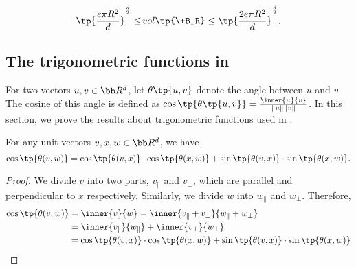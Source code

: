 \begin{corollary}\label{cor:dballvolbound}
    \[
        \tp{\frac{e\pi R^2}{d}}^{\frac{d}{2}}\le\!{vol}\tp{\+B_R} \le \tp{\frac{2e\pi R^2}{d}}^{\frac{d}{2}}.
    \]
\end{corollary}


\subsection{The trigonometric functions in }

For two vectors $u,v\in \bb R^d$, let $\theta\tp{u,v}$ denote the angle between $u$ and $v$. The cosine of this angle is defined as $\cos\tp{\theta\tp{u,v}} = \frac{\inner{u}{v}}{\|u\|\|v\|}$. In this section, we prove the results about trigonometric functions used in .

\begin{lemma}\label{lem:cos}
    For any unit vectors $v,x,w\in \bb R^d$, we have 
    \[
        \cos\tp{\theta(v,w)}= \cos\tp{\theta(v,x)}\cdot \cos\tp{\theta(x,w)} +\sin\tp{\theta(v,x)}\cdot \sin\tp{\theta(x,w)}.
    \]
\end{lemma}
\begin{proof}
    We divide $v$ into two parts, $v_{\|}$ and $v_{\perp}$, which are parallel and perpendicular to $x$ respectively. Similarly, we divide $w$ into $w_{\|}$ and $w_{\perp}$. Therefore,
    \begin{align*}
        \cos\tp{\theta(v,w)} &= \inner{v}{w}= \inner{v_\| + v_\perp}{w_\| + w_\perp}\\
        &= \inner{v_\|}{w_\|} + \inner{v_\perp}{w_\perp}\\
        &=\cos\tp{\theta(v,x)}\cdot \cos\tp{\theta(x,w)} + \sin\tp{\theta(v,x)}\cdot \sin\tp{\theta(x,w)}
    \end{align*}
\end{proof}

